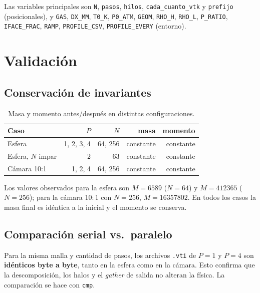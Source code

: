 \documentclass[11pt,a4paper]{article}
\begin{document}
Las variables principales son \texttt{N}, \texttt{pasos}, \texttt{hilos},
\texttt{cada\_cuanto\_vtk} y \texttt{prefijo} (posicionales), y
\texttt{GAS}, \texttt{DX\_MM}, \texttt{T0\_K}, \texttt{P0\_ATM},
\texttt{GEOM}, \texttt{RHO\_H}, \texttt{RHO\_L}, \texttt{P\_RATIO},
\texttt{IFACE\_FRAC}, \texttt{RAMP}, \texttt{PROFILE\_CSV},
\texttt{PROFILE\_EVERY} (entorno).

\section{Validación}

\subsection{Conservación de invariantes}

\begin{table}[H]
\centering
\caption{Masa y momento antes/después en distintas configuraciones.}
\label{tab:valid}
\begin{tabular}{lrrrr}
\toprule
Caso & $P$ & $N$ & masa & momento \\
\midrule
Esfera & 1, 2, 3, 4 & 64, 256 & constante & constante \\
Esfera, $N$ impar & 2 & 63 & constante & constante \\
Cámara 10:1 & 1, 2, 4 & 64, 256 & constante & constante \\
\bottomrule
\end{tabular}
\end{table}

Los valores observados para la esfera son $M=6589$ ($N=64$) y $M=412365$
($N=256$); para la cámara $10{:}1$ con $N=256$, $M=16357802$. En todos los
casos la masa final es idéntica a la inicial y el momento se conserva.

\subsection{Comparación serial vs.\ paralelo}

Para la misma malla y cantidad de pasos, los archivos \texttt{.vti} de $P=1$ y
$P=4$ son \textbf{idénticos byte a byte}, tanto en la esfera como en la cámara.
Esto confirma que la descomposición, los halos y el \emph{gather} de salida no
alteran la física. La comparación se hace con \texttt{cmp}.
\end{document}
